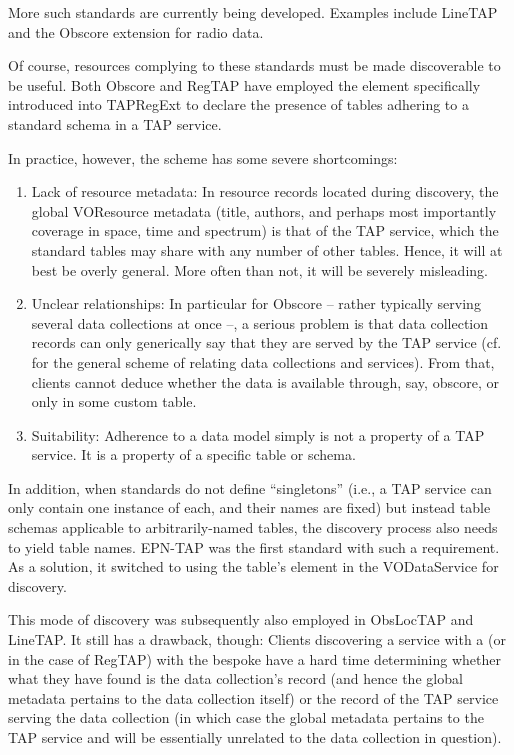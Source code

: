 \documentclass[11pt,a4paper]{ivoa}
\begin{document}
More such standards are currently being developed. Examples include LineTAP
\citep{wd:linetap23} and the Obscore extension for radio data.

Of course, resources complying to these standards must be made
discoverable to be useful.  Both Obscore and RegTAP have employed the
 element specifically introduced into TAPRegExt
\citep{2012ivoa.spec.0827D} to declare the presence of tables adhering
to a standard schema in a TAP service.

In practice, however, the  scheme
has some severe shortcomings:

\begin{enumerate}
\item Lack of resource metadata: In resource records located during
discovery, the global VOResource metadata (title, authors, and perhaps
most importantly coverage in space, time and spectrum) is that of the
TAP service, which the standard tables may share with any number of
other tables.  Hence, it will at best be overly general.  More often
than not, it will be severely misleading.

\item Unclear relationships: In particular for Obscore -- rather
typically serving several data collections at once --, a serious
problem is that data collection records can only generically say
that they are served by the TAP service (cf.~\citet{2019ivoa.spec.0520D}
for the general scheme of relating data collections and services).  From
that, clients cannot deduce whether the data is available through, say,
obscore, or only in some custom table.

\item Suitability: Adherence to a data model simply is not a property of a
TAP service.  It is a property of a specific table or schema.
\end{enumerate}

In addition, when standards do not define ``singletons'' (i.e., a TAP
service can only contain one instance of each, and their names are
fixed) but instead table schemas applicable to arbitrarily-named tables,
the discovery process also needs to yield table names.
EPN-TAP was the first standard with such a requirement.  As a
solution, it switched to using the table's  element in
the VODataService \citep{2021ivoa.spec.1102D}  for
discovery.

This mode of discovery was subsequently also employed in ObsLocTAP and
LineTAP.  It still has a drawback, though: Clients discovering a service
with a  (or  in the case of RegTAP) with the
bespoke  have a hard time determining whether what they
have found is the data collection's record (and hence the global
metadata pertains to the data collection itself) or the record of the
TAP service serving the data collection (in which case the global
metadata pertains to the TAP service and will be essentially unrelated
to the data collection in question).
\end{document}
